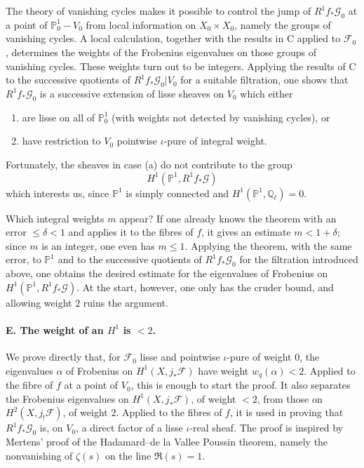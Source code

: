 \documentclass[11pt]{article}
\theoremstyle{remark}
\newcommand{\Ql}{\mathbb{Q}_\ell}
\begin{document}
The theory of vanishing cycles makes it possible to control the jump of $R^1f_*\mathcal G_0$ at a point of $\mathbb P^1_0-V_0$ from local information on $X_0\times X_0$, namely the groups of vanishing cycles. A local calculation, together with the results in C applied to $\mathcal F_0$, determines the weights of the Frobenius eigenvalues on those groups of vanishing cycles. These weights turn out to be integers. Applying the results of C to the successive quotients of $R^1f_*\mathcal G_0|V_0$ for a suitable filtration, one shows that $R^1f_*\mathcal G_0$ is a successive extension of lisse sheaves on $V_0$ which either
\begin{enumerate}[label=(\alph*)]
\item are lisse on all of $\mathbb P^1_0$ (with weights not detected by vanishing cycles), or
\item have restriction to $V_0$ pointwise $\iota$-pure of integral weight.
\end{enumerate}
Fortunately, the sheaves in case (a) do not contribute to the group
\[
H^1(\mathbb P^1,R^1f_*\mathcal G)
\]
which interests us, since $\mathbb P^1$ is simply connected and $H^1(\mathbb P^1,\Ql)=0$.

Which integral weights $m$ appear? If one already knows the theorem with an error $\le \delta<1$ and applies it to the fibres of $f$, it gives an estimate $m<1+\delta$; since $m$ is an integer, one even has $m\le 1$. Applying the theorem, with the same error, to $\mathbb P^1$ and to the successive quotients of $R^1f_*\mathcal G_0$ for the filtration introduced above, one obtains the desired estimate for the eigenvalues of Frobenius on $H^1(\mathbb P^1,R^1f_*\mathcal G)$. At the start, however, one only has the cruder bound, and allowing weight $2$ ruins the argument.

\paragraph{E. The weight of an $H^1$ is $<2$.}
We prove directly that, for $\mathcal F_0$ lisse and pointwise $\iota$-pure of weight $0$, the eigenvalues $\alpha$ of Frobenius on $H^1(X,j_*\mathcal F)$ have weight $w_q(\alpha)<2$. Applied to the fibre of $f$ at a point of $V_0$, this is enough to start the proof. It also separates the Frobenius eigenvalues on $H^1(X,j_*\mathcal F)$, of weight $<2$, from those on $H^2(X,j_!\mathcal F)$, of weight $2$. Applied to the fibres of $f$, it is used in proving that $R^1f_*\mathcal G_0$ is, on $V_0$, a direct factor of a lisse $\iota$-real sheaf. The proof is inspired by Mertens' proof of the Hadamard--de la Vallee Poussin theorem, namely the nonvanishing of $\zeta(s)$ on the line $\Re(s)=1$.
\end{document}
